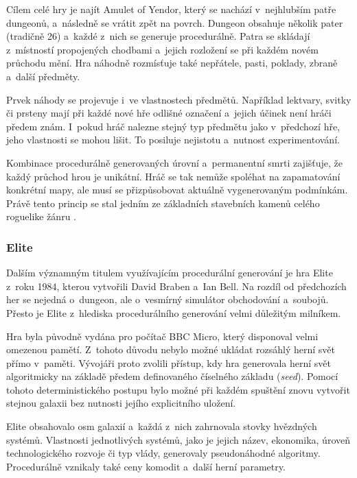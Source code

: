 \documentclass[
   program=itk,
   biblatex,
   figures=true,
   tables=true,
   glossaries,
   index
]{kidiplom}
\begin{document}
Cílem celé hry je najít Amulet of Yendor, který se nachází v~nejhlubším patře dungeonů, a~následně se vrátit zpět na povrch. Dungeon obsahuje několik pater (tradičně 26) a~každé z~nich se generuje procedurálně. Patra se skládají z~místností propojených chodbami a~jejich rozložení se při každém novém průchodu mění. Hra náhodně rozmísťuje také nepřátele, pasti, poklady, zbraně a~další předměty.

Prvek náhody se projevuje i~ve vlastnostech předmětů. Například lektvary, svitky či prsteny mají při každé nové hře odlišné označení a~jejich účinek není hráči předem znám. I~pokud hráč nalezne stejný typ předmětu jako v~předchozí hře, jeho vlastnosti se mohou lišit. To posiluje nejistotu a~nutnost experimentování.

Kombinace procedurálně generovaných úrovní a~permanentní smrti zajišťuje, že každý průchod hrou je unikátní. Hráč se tak nemůže spoléhat na zapamatování konkrétní mapy, ale musí se přizpůsobovat aktuálně vygenerovaným podmínkám. Právě tento princip se stal jedním ze základních stavebních kamenů celého roguelike žánru \cite{PCGRogue,enwiki:1337873899}.

\subsubsection{Elite}
\label{sec:elite}

Dalším významným titulem využívajícím procedurální generování je hra Elite z~roku 1984, kterou vytvořili David Braben a~Ian Bell. Na rozdíl od předchozích her se nejedná o~dungeon, ale o~vesmírný simulátor obchodování a~soubojů. Přesto je Elite z~hlediska procedurálního generování velmi důležitým milníkem.

Hra byla původně vydána pro počítač BBC Micro, který disponoval velmi omezenou pamětí. Z~tohoto důvodu nebylo možné ukládat rozsáhlý herní svět přímo v~paměti. Vývojáři proto zvolili přístup, kdy hra generovala herní svět algoritmicky na základě předem definovaného číselného základu (\textit{seed}). Pomocí tohoto deterministického postupu bylo možné při každém spuštění znovu vytvořit stejnou galaxii bez nutnosti jejího explicitního uložení.

Elite obsahovalo osm galaxií a~každá z~nich zahrnovala stovky hvězdných systémů. Vlastnosti jednotlivých systémů, jako je jejich název, ekonomika, úroveň technologického rozvoje či typ vlády, generovaly pseudonáhodné algoritmy. Procedurálně vznikaly také ceny komodit a~další herní parametry.
\end{document}
